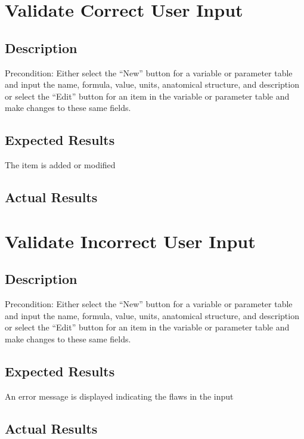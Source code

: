 \documentclass{article}
\begin{document}
\section{Validate Correct User Input}
\subsection{Description}
Precondition: Either select the ``New'' button for a variable or parameter table and input the name, formula, value, units, anatomical structure, and description or select the ``Edit'' button for an item in the variable or parameter table and make changes to these same fields.
\subsection{Expected Results}
The item is added or modified
\subsection{Actual Results}

\section{Validate Incorrect User Input}
\subsection{Description}
Precondition: Either select the ``New'' button for a variable or parameter table and input the name, formula, value, units, anatomical structure, and description or select the ``Edit'' button for an item in the variable or parameter table and make changes to these same fields.
\subsection{Expected Results}
An error message is displayed indicating the flaws in the input
\subsection{Actual Results}
\end{document}
